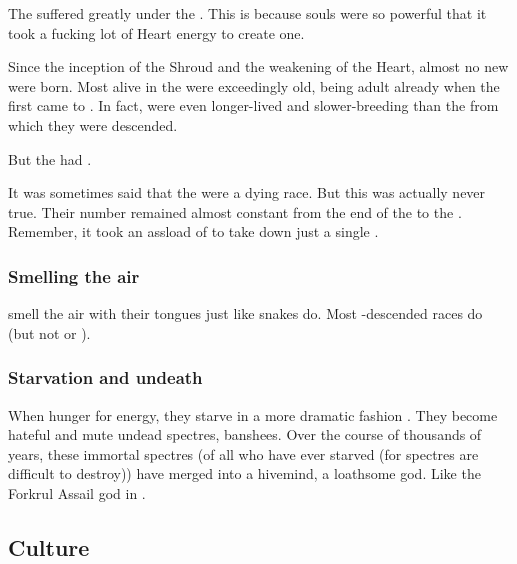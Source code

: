 The \dragons{} suffered greatly under the . 
This is because \draconian{} souls were so powerful that it took a fucking lot of Heart energy to create one. 

Since the inception of the Shroud and the weakening of the Heart, almost no new \dragons were born.
Most \dragons alive in the \thirdbanewar were exceedingly old, being adult already when the first \resphain came to \Miith. 
In fact, \dragons were even longer-lived and slower-breeding than the \ophidians from which they were descended. 

But the  had .

It was sometimes said that the \dragons were a dying race.
But this was actually never true. 
Their number remained almost constant from the end of the \secondbanewar to the \thirdbanewar.
Remember, it took an assload of \resphain to take down just a single \dragon.






\subsubsection{Smelling the air}
\Dragons smell the air with their tongues just like snakes do. 
Most \ophidian-descended races do (but not \scathae or \cregorrs). 





\subsubsection{Starvation and undeath}
When \dragons hunger for energy, they starve in a more dramatic fashion . 
They become hateful and mute undead spectres, banshees. 
Over the course of thousands of years, these immortal spectres (of all \dragons who have ever starved (for spectres are difficult to destroy)) have merged into a hivemind, a loathsome god. 
Like the Forkrul Assail god in \cite{StevenErikson:TheCrippledGod}. 










\subsection{Culture}





